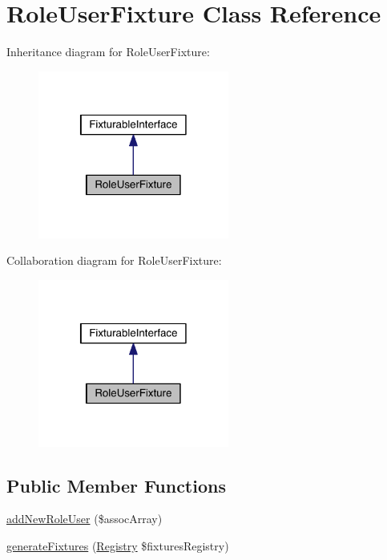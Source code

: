 \hypertarget{class_security_1_1_role_user_fixture}{\section{Role\-User\-Fixture Class Reference}
\label{class_security_1_1_role_user_fixture}
}


Inheritance diagram for Role\-User\-Fixture\-:
\nopagebreak
\begin{figure}[H]
\begin{center}
\leavevmode
\includegraphics[width=178pt]{class_security_1_1_role_user_fixture__inherit__graph}
\end{center}
\end{figure}


Collaboration diagram for Role\-User\-Fixture\-:
\nopagebreak
\begin{figure}[H]
\begin{center}
\leavevmode
\includegraphics[width=178pt]{class_security_1_1_role_user_fixture__coll__graph}
\end{center}
\end{figure}
\subsection*{Public Member Functions}
\begin{DoxyCompactItemize}
\item 
\hyperlink{class_security_1_1_role_user_fixture_a719db668c620859fa5438f203ad27226}{add\-New\-Role\-User} (\$assoc\-Array)
\item 
\hyperlink{class_security_1_1_role_user_fixture_a60af9abed72c391727622c642cc4c612}{generate\-Fixtures} (\hyperlink{classapp_1_1models_1_1core_1_1_registry}{Registry} \$fixtures\-Registry)
\end{DoxyCompactItemize}
